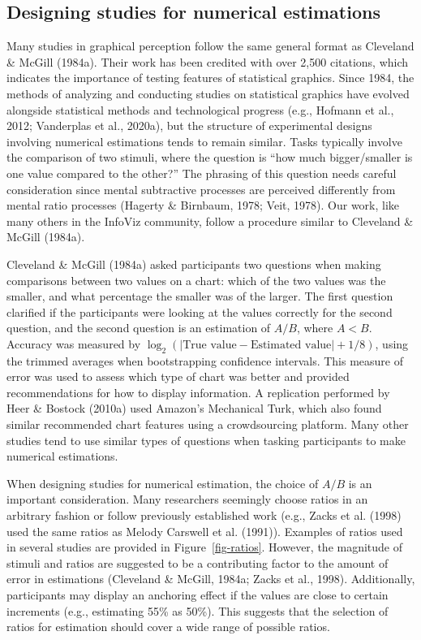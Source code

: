 \documentclass[phd]{nuthesis}
\begin{document}
\subsection{Designing studies for numerical
estimations}\label{designing-studies-for-numerical-estimations}

Many studies in graphical perception follow the same general format as
Cleveland \& McGill (1984a). Their work has been credited with over
2,500 citations, which indicates the importance of testing features of
statistical graphics. Since 1984, the methods of analyzing and
conducting studies on statistical graphics have evolved alongside
statistical methods and technological progress (e.g., Hofmann et al.,
2012; Vanderplas et al., 2020a), but the structure of experimental
designs involving numerical estimations tends to remain similar. Tasks
typically involve the comparison of two stimuli, where the question is
``how much bigger/smaller is one value compared to the other?'' The
phrasing of this question needs careful consideration since mental
subtractive processes are perceived differently from mental ratio
processes (Hagerty \& Birnbaum, 1978; Veit, 1978). Our work, like many
others in the InfoViz community, follow a procedure similar to Cleveland
\& McGill (1984a).

Cleveland \& McGill (1984a) asked participants two questions when making
comparisons between two values on a chart: which of the two values was
the smaller, and what percentage the smaller was of the larger. The
first question clarified if the participants were looking at the values
correctly for the second question, and the second question is an
estimation of \(A/B\), where \(A<B\). Accuracy was measured by
\(\log_2(|\text{True value}-\text{Estimated value}|+1/8)\), using the
trimmed averages when bootstrapping confidence intervals. This measure
of error was used to assess which type of chart was better and provided
recommendations for how to display information. A replication performed
by Heer \& Bostock (2010a) used Amazon's Mechanical Turk, which also
found similar recommended chart features using a crowdsourcing platform.
Many other studies tend to use similar types of questions when tasking
participants to make numerical estimations.

When designing studies for numerical estimation, the choice of \(A/B\)
is an important consideration. Many researchers seemingly choose ratios
in an arbitrary fashion or follow previously established work (e.g.,
Zacks et al. (1998) used the same ratios as Melody Carswell et al.
(1991)). Examples of ratios used in several studies are provided in
Figure~\ref{fig-ratios}. However, the magnitude of stimuli and ratios
are suggested to be a contributing factor to the amount of error in
estimations (Cleveland \& McGill, 1984a; Zacks et al., 1998).
Additionally, participants may display an anchoring effect if the values
are close to certain increments (e.g., estimating 55\% as 50\%). This
suggests that the selection of ratios for estimation should cover a wide
range of possible ratios.
\end{document}
